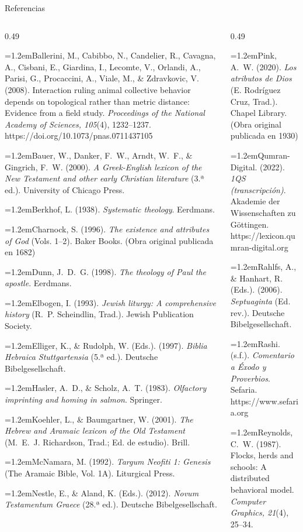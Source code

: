\documentclass[hyperref={bookmarks=false},aspectratio=169]{beamer}
\newcommand{\refapa}[1]{\par{\RaggedRight\hangindent=1.2em\hangafter=1\noindent #1\par}\vspace{3pt}}
\begin{document}
\begin{frame}{Referencias}
\fontsize{5.4}{6.4}\selectfont
\begin{columns}[t,onlytextwidth]
\begin{column}{0.49\textwidth}
\refapa{Ballerini, M., Cabibbo, N., Candelier, R., Cavagna, A., Cisbani, E., Giardina, I., Lecomte, V., Orlandi, A., Parisi, G., Procaccini, A., Viale, M., \& Zdravkovic, V. (2008). Interaction ruling animal collective behavior depends on topological rather than metric distance: Evidence from a field study. \emph{Proceedings of the National Academy of Sciences, 105}(4), 1232--1237. https://doi.org/10.1073/pnas.0711437105}
\refapa{Bauer, W., Danker, F.~W., Arndt, W.~F., \& Gingrich, F.~W. (2000). \emph{A Greek-English lexicon of the New Testament and other early Christian literature} (3.ª ed.). University of Chicago Press.}
\refapa{Berkhof, L. (1938). \emph{Systematic theology}. Eerdmans.}
\refapa{Charnock, S. (1996). \emph{The existence and attributes of God} (Vols. 1--2). Baker Books. (Obra original publicada en 1682)}
\refapa{Dunn, J.~D.~G. (1998). \emph{The theology of Paul the apostle}. Eerdmans.}
\refapa{Elbogen, I. (1993). \emph{Jewish liturgy: A comprehensive history} (R.~P. Scheindlin, Trad.). Jewish Publication Society.}
\refapa{Elliger, K., \& Rudolph, W. (Eds.). (1997). \emph{Biblia Hebraica Stuttgartensia} (5.ª ed.). Deutsche Bibelgesellschaft.}
\refapa{Hasler, A.~D., \& Scholz, A.~T. (1983). \emph{Olfactory imprinting and homing in salmon}. Springer.}
\refapa{Koehler, L., \& Baumgartner, W. (2001). \emph{The Hebrew and Aramaic lexicon of the Old Testament} (M.~E.~J. Richardson, Trad.; Ed. de estudio). Brill.}
\refapa{McNamara, M. (1992). \emph{Targum Neofiti 1: Genesis} (The Aramaic Bible, Vol. 1A). Liturgical Press.}
\refapa{Nestle, E., \& Aland, K. (Eds.). (2012). \emph{Novum Testamentum Graece} (28.ª ed.). Deutsche Bibelgesellschaft.}
\end{column}
\begin{column}{0.49\textwidth}
\refapa{Pink, A.~W. (2020). \emph{Los atributos de Dios} (E. Rodríguez Cruz, Trad.). Chapel Library. (Obra original publicada en 1930)}
\refapa{Qumran-Digital. (2022). \emph{1QS (transcripción)}. Akademie der Wissenschaften zu Göttingen. https://lexicon.qumran-digital.org}
\refapa{Rahlfs, A., \& Hanhart, R. (Eds.). (2006). \emph{Septuaginta} (Ed. rev.). Deutsche Bibelgesellschaft.}
\refapa{Rashi. (s.f.). \emph{Comentario a Éxodo y Proverbios}. Sefaria. https://www.sefaria.org}
\refapa{Reynolds, C.~W. (1987). Flocks, herds and schools: A distributed behavioral model. \emph{Computer Graphics, 21}(4), 25--34.}

\end{column}
\end{columns}
\end{frame}
\end{document}
